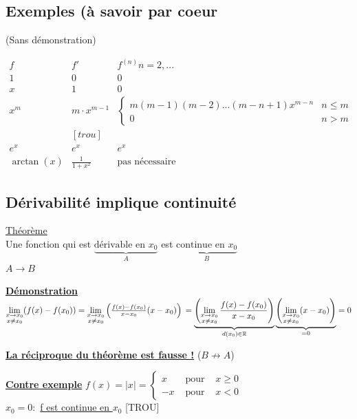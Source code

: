 \documentclass[12pt,a4paper]{article}
\newcommand{\limite}{\lim\limits_}
\newcommand{\evid}[1]{\textbf{\underline{#1}}}
\newcommand{\R}{\ensuremath{\mathbb{R}} }
\newcommand{\pour}{\mbox{ pour }}
\newcommand{\Theoreme}{\underline{Théorème} }
\begin{document}
{\subsection{Exemples (à savoir par coeur}
(Sans démonstration)\\
\begin{center}
$\begin{array}{ccc}
f & f' & f^{(n)} n = 2,...\\
1 & 0 & 0\\
x & 1 & 0\\
x^m & m\cdot x^{m-1} & 
\left\{ \begin{array}{ll}
m(m-1)(m-2)...(m-n+1)x^{m-n} & n \leq m\\
0 & n > m
\end{array} \right.\\
&[trou]&\\
e^x & e^x & e^x\\
\arctan(x) & \frac{1}{1+x^2} & \mbox{pas nécessaire}
\end{array}$
\end{center}
\subsection{Dérivabilité implique continuité}
\begin{boite}
\Theoreme\\
Une fonction qui est $\underbrace{\mbox{dérivable en }x_0}_A$ est $\underbrace{\mbox{continue en }x_0}_B$\\
$A \to B$
\end{boite}
\evid{Démonstration} $\limite{\substack{x \to x_0 \\ x \neq x_0}}(f(x)- f(x_0)) = \limite{\substack{x \to x_0\\ x \neq x_0}}\left(\frac{f(x) - f(x_0)}{x - x_0} (x-x_0)\right)\\
 = \underbrace{\left(\limite{\substack{x \to x_0 \\ x \neq x_0}}\frac{f(x) - f(x_0)}{x-x_0}\right)}_{d(x_0) \in \R}\underbrace{\left(\limite{\substack{x \to x_0 \\ x \neq x_0}}(x-x_0)\right)}_{=0} = 0$\\
\begin{center}
\evid{La réciproque du théorème est fausse !} ($B\not \to A$)
\end{center}
\evid{Contre exemple} $f(x) = |x| = 
\left\{
\begin{array}{lll}
x & \pour & x \geq 0\\
-x & \pour & x < 0
\end{array}
\right.$\\
$x_0 = 0:$ \underline{f est continue en $x_0$}
[TROU]
}
\end{document}
